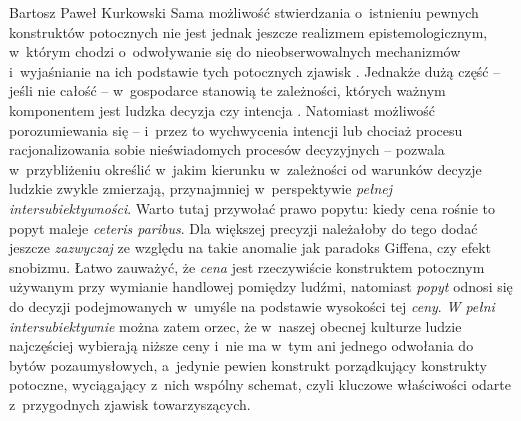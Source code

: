 \begin{artplenv}{Bartosz Paweł Kurkowski}
Sama możliwość stwierdzania o~istnieniu pewnych konstruktów potocznych nie jest jednak jeszcze realizmem
epistemologicznym, w~którym chodzi o~odwoływanie się do nieobserwowalnych mechanizmów i~wyjaśnianie na ich podstawie
tych potocznych zjawisk
\parencite[s.~261]{gorazda_filozofia_2014}.
Jednakże dużą
część -- jeśli nie całość -- w~gospodarce stanowią te zależności, których ważnym komponentem jest ludzka decyzja czy intencja
\parencite[s.~214]{gorazda_filozofia_2014}.
Natomiast możliwość porozumiewania się -- i~przez to wychwycenia
intencji lub chociaż procesu racjonalizowania sobie nieświadomych procesów decyzyjnych -- pozwala w~przybliżeniu
określić w~jakim kierunku w~zależności od warunków decyzje ludzkie zwykle zmierzają, przynajmniej w~perspektywie
\textit{pełnej intersubiektywności}. Warto tutaj przywołać prawo popytu: kiedy cena rośnie to popyt maleje
\textit{ceteris paribus}. Dla większej precyzji należałoby do tego dodać jeszcze \textit{zazwyczaj} ze względu na takie
anomalie jak paradoks Giffena, czy efekt snobizmu. Łatwo zauważyć, że \textit{cena} jest rzeczywiście konstruktem
potocznym używanym przy wymianie handlowej pomiędzy ludźmi, natomiast \textit{popyt }odnosi się do decyzji
podejmowanych w~umyśle na podstawie wysokości tej \textit{ceny}. \textit{W pełni intersubiektywnie }można zatem orzec,
że w~naszej obecnej kulturze ludzie najczęściej wybierają niższe ceny i~nie ma w~tym ani jednego odwołania do bytów
pozaumysłowych, a~jedynie pewien konstrukt porządkujący konstrukty potoczne, wyciągający z~nich wspólny schemat, czyli
kluczowe właściwości odarte z~przygodnych zjawisk towarzyszących.



\end{artplenv}
